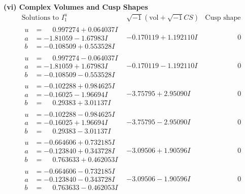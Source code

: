 \documentclass[1p]{elsarticle_modified}
\theoremstyle{definition}
\newcommand{\I}{\sqrt{-1}}
\begin{document}
\newpage\flushleft \textbf{(vi) Complex Volumes and Cusp Shapes}
$$\begin{array}{c|c|c}  
\text{Solutions to }I^u_{1}& \I (\text{vol} + \sqrt{-1}CS) & \text{Cusp shape}\\
 \hline 
\begin{aligned}
u &= \phantom{-}0.997274 + 0.064037 I \\
a &= -1.81059 - 1.67983 I \\
b &= -0.108509 + 0.553528 I\end{aligned}
 & -0.170119 + 1.192110 I & \phantom{-0.000000 } 0 \\ \hline\begin{aligned}
u &= \phantom{-}0.997274 - 0.064037 I \\
a &= -1.81059 + 1.67983 I \\
b &= -0.108509 - 0.553528 I\end{aligned}
 & -0.170119 - 1.192110 I & \phantom{-0.000000 } 0 \\ \hline\begin{aligned}
u &= -0.102288 + 0.984625 I \\
a &= -0.16025 - 1.96694 I \\
b &= \phantom{-}0.29383 + 3.01137 I\end{aligned}
 & -3.75795 + 2.95090 I & \phantom{-0.000000 } 0 \\ \hline\begin{aligned}
u &= -0.102288 - 0.984625 I \\
a &= -0.16025 + 1.96694 I \\
b &= \phantom{-}0.29383 - 3.01137 I\end{aligned}
 & -3.75795 - 2.95090 I & \phantom{-0.000000 } 0 \\ \hline\begin{aligned}
u &= -0.664606 + 0.732185 I \\
a &= -0.123840 + 0.343728 I \\
b &= \phantom{-}0.763633 + 0.462053 I\end{aligned}
 & -3.09506 + 1.90596 I & \phantom{-0.000000 } 0 \\ \hline\begin{aligned}
u &= -0.664606 - 0.732185 I \\
a &= -0.123840 - 0.343728 I \\
b &= \phantom{-}0.763633 - 0.462053 I\end{aligned}
 & -3.09506 - 1.90596 I & \phantom{-0.000000 } 0 \\ \hline\begin{aligned}

\end{aligned}
\end{array}$$
\end{document}
